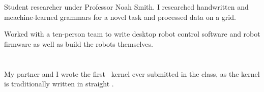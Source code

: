 Student researcher under Professor Noah Smith.
I researched handwritten and meachine-learned grammars for a novel task and processed data on a  grid.


Worked with a ten-person team to write desktop robot control software and
robot firmware as well as build the robots themselves.

\section{}
My partner and I wrote the first \kw{\Cplusplus}\ kernel
ever submitted in the class, as the kernel is traditionally written in
straight .




